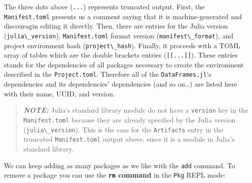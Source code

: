\documentclass[
  notoc %
]{tufte-book}
\newcommand{\passthrough}[1]{#1}
\begin{document}
The three dots above (\passthrough{\lstinline!...!}) represents
truncated output. First, the \passthrough{\lstinline!Manifest.toml!}
presents us a comment saying that it is machine-generated and
discouragin editing it directly. Then, there are entries for the Julia
version (\passthrough{\lstinline!julia\_version!}),
\passthrough{\lstinline!Manifest.toml!} format version
(\passthrough{\lstinline!manifest\_format!}), and project environment
hash (\passthrough{\lstinline!project\_hash!}). Finally, it proceeds
with a TOML array of tables which are the double brackets entries
(\passthrough{\lstinline![[...]]!}). These entries stands for the
dependencies of all packages necessary to create the environment
described in the \passthrough{\lstinline!Project.toml!}. Therefore all
of the \passthrough{\lstinline!DataFrames.jl!}`s dependencies and its
dependencies' dependencies (and so on\ldots) are listed here with their
name, UUID, and version.

\begin{quote}
\textbf{\emph{NOTE:}} Julia's standard library module do not have a
\passthrough{\lstinline!version!} key in the
\passthrough{\lstinline!Manifest.toml!} because they are already
specified by the Julia version
(\passthrough{\lstinline!julia\_version!}). This is the case for the
\passthrough{\lstinline!Artifacts!} entry in the truncated
\passthrough{\lstinline!Manifest.toml!} output above, since it is a
module in Julia's standard library.
\end{quote}

We can keep adding as many packages as we like with the
\passthrough{\lstinline!add!} command. To remove a package you can use
the \textbf{\passthrough{\lstinline!rm!} command} in the
\passthrough{\lstinline!Pkg!} REPL mode:
\end{document}
